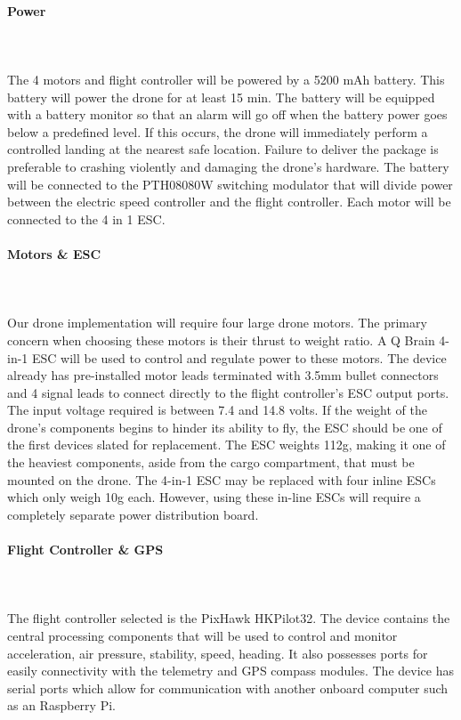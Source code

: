 \documentclass[12pt]{extarticle}
\begin{document}
\paragraph{Power} 
\vspace{-3mm}
\ \\
\ \\
The 4 motors and flight controller will be powered by a 5200 mAh battery. This battery will power the drone for at least 15 min. The battery will be equipped with a battery monitor so that an alarm will go off when the battery power goes below a predefined level.  If this occurs, the drone will immediately perform a controlled landing at the nearest safe location.  Failure to deliver the package is preferable to crashing violently and damaging the drone's hardware.  The battery will be connected to the PTH08080W switching modulator that will divide power between the electric speed controller and the flight controller. Each motor will be connected to the 4 in 1 ESC.
\vspace{2mm}

\paragraph{Motors \& ESC}
\vspace{-3mm}
\ \\
\ \\
Our drone implementation will require four large drone motors.  The primary concern when choosing these motors is their thrust to weight ratio. A Q Brain 4-in-1 ESC will be used to control and regulate power to these motors. The device already has pre-installed motor leads terminated with 3.5mm bullet connectors and 4 signal leads to connect directly to the flight controller's ESC output ports. The input voltage required is between 7.4 and 14.8 volts. If the weight of the drone's components begins to hinder its ability to fly, the ESC should be one of the first devices slated for replacement.  The ESC weights 112g, making it one of the heaviest components, aside from the cargo compartment, that must be mounted on the drone.  The 4-in-1 ESC may be replaced with four inline ESCs which only weigh 10g each.  However, using these in-line ESCs will require a completely separate power distribution board. 

\paragraph{Flight Controller \& GPS}
\vspace{-3mm}
\ \\
\ \\
The flight controller selected is the PixHawk HKPilot32. The device contains the central processing components that will be used to control and monitor acceleration, air pressure, stability, speed, heading.  It also possesses ports for easily connectivity with the telemetry and GPS compass modules. The device has serial ports which allow for communication with another onboard computer such as an Raspberry Pi.
\end{document}
